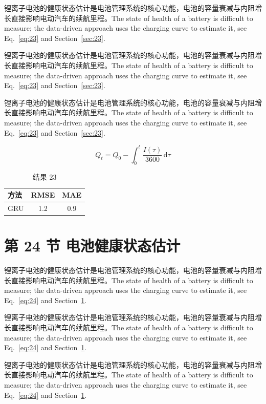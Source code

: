 \documentclass[UTF8,fontset=mac]{ctexart}
\begin{document}
锂离子电池的健康状态估计是电池管理系统的核心功能，电池的容量衰减与内阻增长直接影响电动汽车的续航里程\cite{a2020}。The state of health of a battery is difficult to measure; the data-driven approach uses the charging curve to estimate it, see Eq.~\eqref{eq:23} and Section~\ref{sec:23}.

锂离子电池的健康状态估计是电池管理系统的核心功能，电池的容量衰减与内阻增长直接影响电动汽车的续航里程\cite{a2020}。The state of health of a battery is difficult to measure; the data-driven approach uses the charging curve to estimate it, see Eq.~\eqref{eq:23} and Section~\ref{sec:23}.

锂离子电池的健康状态估计是电池管理系统的核心功能，电池的容量衰减与内阻增长直接影响电动汽车的续航里程\cite{a2020}。The state of health of a battery is difficult to measure; the data-driven approach uses the charging curve to estimate it, see Eq.~\eqref{eq:23} and Section~\ref{sec:23}.

\begin{equation}\label{eq:23}
  Q_t = Q_0 - \int_0^t \frac{I(\tau)}{3600}\,\mathrm{d}\tau
\end{equation}
\begin{table}[h]\centering\begin{tabular}{lcc}\toprule 方法 & RMSE & MAE\\\midrule GRU & 1.2 & 0.9\\\bottomrule\end{tabular}\caption{结果 23}\end{table}

\section{第 24 节 电池健康状态估计}\label{sec:24}
锂离子电池的健康状态估计是电池管理系统的核心功能，电池的容量衰减与内阻增长直接影响电动汽车的续航里程\cite{a2020}。The state of health of a battery is difficult to measure; the data-driven approach uses the charging curve to estimate it, see Eq.~\eqref{eq:24} and Section~\ref{sec:24}.

锂离子电池的健康状态估计是电池管理系统的核心功能，电池的容量衰减与内阻增长直接影响电动汽车的续航里程\cite{a2020}。The state of health of a battery is difficult to measure; the data-driven approach uses the charging curve to estimate it, see Eq.~\eqref{eq:24} and Section~\ref{sec:24}.

锂离子电池的健康状态估计是电池管理系统的核心功能，电池的容量衰减与内阻增长直接影响电动汽车的续航里程\cite{a2020}。The state of health of a battery is difficult to measure; the data-driven approach uses the charging curve to estimate it, see Eq.~\eqref{eq:24} and Section~\ref{sec:24}.
\end{document}
